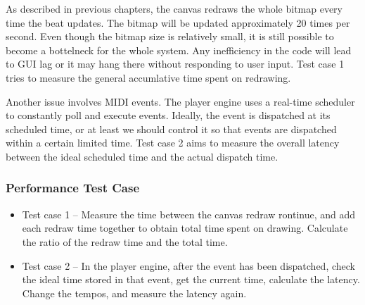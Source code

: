 As described in previous chapters, the canvas redraws the whole bitmap every time 
the beat updates. The bitmap will be updated approximately 20 times per second.
Even though the bitmap size is relatively small, it is still possible to become 
a bottelneck for the whole system. Any inefficiency in the code will lead to GUI 
lag or it may hang there without responding to user input. Test case 1 tries 
to measure the general accumlative time spent on redrawing. 

Another issue involves MIDI events. The player engine uses a real-time scheduler to  
constantly poll and execute events. Ideally, the event is dispatched at its 
scheduled time, or at least we should control it so that events are dispatched within 
a certain limited time. Test case 2 aims to measure the overall latency between 
the ideal scheduled time and the actual dispatch time. 
\subsubsection{Performance Test Case}
\begin{itemize}
  \item Test case 1 -- Measure the time between the canvas redraw rontinue, and 
        add each redraw time together to obtain total time spent on drawing. 
        Calculate the ratio of the redraw time and the total time.
  \item Test case 2 -- In the player engine, after the event has been dispatched, 
        check the ideal time stored in that event, get the current time, calculate 
        the latency. Change the tempos, and measure the latency again.
\end{itemize}
